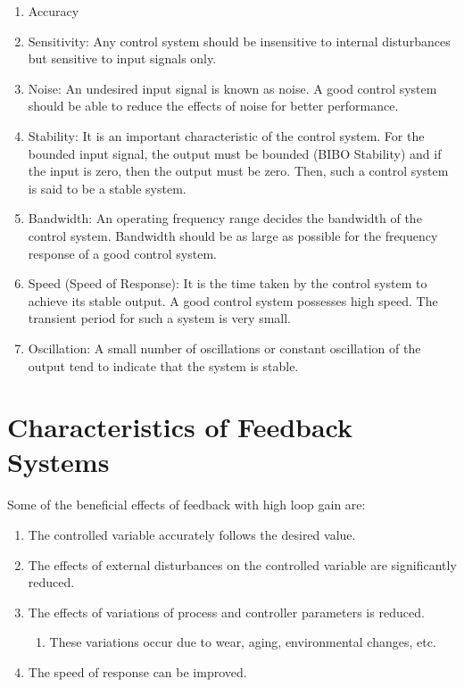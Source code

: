 \documentclass[
  14pt,
  a4paper,
  oneside,
  open=any,
  a4paper,
  14pt]{report}
\providecommand{\tightlist}{%
  \setlength{\itemsep}{0pt}\setlength{\parskip}{0pt}}\usepackage{longtable,booktabs,array}
\begin{document}
\begin{enumerate}
\def\labelenumi{\arabic{enumi}.}
\item
  Accuracy
\item
  Sensitivity: Any control system should be insensitive to internal
  disturbances but sensitive to input signals only.
\item
  Noise: An undesired input signal is known as noise. A good control
  system should be able to reduce the effects of noise for better
  performance.
\item
  Stability: It is an important characteristic of the control system.
  For the bounded input signal, the output must be bounded (BIBO
  Stability) and if the input is zero, then the output must be zero.
  Then, such a control system is said to be a stable system.
\item
  Bandwidth: An operating frequency range decides the bandwidth of the
  control system. Bandwidth should be as large as possible for the
  frequency response of a good control system.
\item
  Speed (Speed of Response): It is the time taken by the control system
  to achieve its stable output. A good control system possesses high
  speed. The transient period for such a system is very small.
\item
  Oscillation: A small number of oscillations or constant oscillation of
  the output tend to indicate that the system is stable.
\end{enumerate}

\section{Characteristics of Feedback
Systems}\label{characteristics-of-feedback-systems}

Some of the beneficial effects of feedback with high loop gain are:

\begin{enumerate}
\def\labelenumi{\arabic{enumi}.}
\item
  The controlled variable accurately follows the desired value.
\item
  The effects of external disturbances on the controlled variable are
  significantly reduced.
\item
  The effects of variations of process and controller parameters is
  reduced.

  \begin{enumerate}
  \def\labelenumii{\roman{enumii}.}
  \tightlist
  \item
    These variations occur due to wear, aging, environmental changes,
    etc.
  \end{enumerate}
\item
  The speed of response can be improved.
\end{enumerate}
\end{document}
